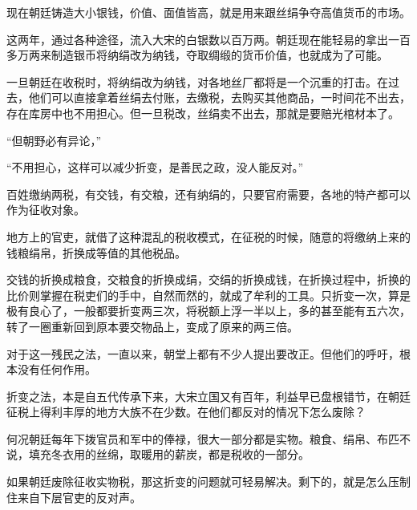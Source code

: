 现在朝廷铸造大小银钱，价值、面值皆高，就是用来跟丝绢争夺高值货币的市场。

这两年，通过各种途径，流入大宋的白银数以百万两。朝廷现在能轻易的拿出一百多万两来制造银币将纳绢改为纳钱，夺取绸缎的货币价值，也就成为了可能。

一旦朝廷在收税时，将纳绢改为纳钱，对各地丝厂都将是一个沉重的打击。在过去，他们可以直接拿着丝绢去付账，去缴税，去购买其他商品，一时间花不出去，存在库房中也不用担心。但一旦税改，丝绢卖不出去，那就是要赔光棺材本了。

“但朝野必有异论，”

“不用担心，这样可以减少折变，是善民之政，没人能反对。”

百姓缴纳两税，有交钱，有交粮，还有纳绢的，只要官府需要，各地的特产都可以作为征收对象。

地方上的官吏，就借了这种混乱的税收模式，在征税的时候，随意的将缴纳上来的钱粮绢帛，折换成等值的其他税品。

交钱的折换成粮食，交粮食的折换成绢，交绢的折换成钱，在折换过程中，折换的比价则掌握在税吏们的手中，自然而然的，就成了牟利的工具。只折变一次，算是极有良心了，一般都要折变两三次，将税额上浮一半以上，多的甚至能有五六次，转了一圈重新回到原本要交物品上，变成了原来的两三倍。

对于这一残民之法，一直以来，朝堂上都有不少人提出要改正。但他们的呼吁，根本没有任何作用。

折变之法，本是自五代传承下来，大宋立国又有百年，利益早已盘根错节，在朝廷征税上得利丰厚的地方大族不在少数。在他们都反对的情况下怎么废除？

何况朝廷每年下拨官员和军中的俸禄，很大一部分都是实物。粮食、绢帛、布匹不说，填充冬衣用的丝绵，取暖用的薪炭，都是税收的一部分。

如果朝廷废除征收实物税，那这折变的问题就可轻易解决。剩下的，就是怎么压制住来自下层官吏的反对声。
